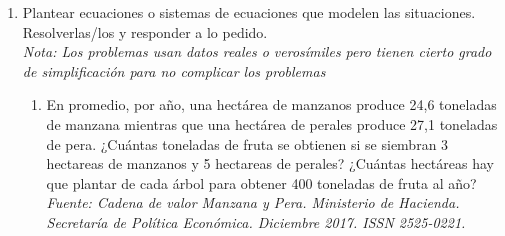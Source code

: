 \documentclass[a4paper]{article}
\makeatletter
\newcommand{\exercise}{\item}
\newenvironment{amatrix}[1]{%
  \left(\begin{array}{@{}*{#1}{c}|c@{}}
}{%
  \end{array}\right)
}
\makeatother
\begin{document}
\begin{enumerate}
\begin{multicols}{2}
\begin{enumerate} [label=(\alph*)]
		\item $\begin{amatrix}{2} 1 & 0 & 4 \\ 0 & 0 & 0 \end{amatrix}$
		\item $\begin{amatrix}{3} 1 & -2 & 0 & 7 \\ 0 & 3 & 1 & -5 \\ 0 & 0 & 0 & 0 \end{amatrix}$
		\item $\begin{amatrix}{3} 1 & 0 & -1 & 7 \\ 0 & 1 & 2 & 0 \\ 0 & 0 & 0 & 0 \\ 0 & 0 & 0 & 0 \end{amatrix}$
		\item $\begin{amatrix}{4} 1 & -2 & 0 & 0 & -6 \\ 0 & 0 & 1 & 0 & 2 \\ 0 & 0 & 0 & 1 & 0 \end{amatrix}$
		\item $\begin{amatrix}{4} 1 & -1 & 2 & 3 & -2 \\ 0 & 0 & 0 & 0 & 3 \\ 0 & 0 & 0 & 0 & 0 \end{amatrix}$
		\item $\begin{amatrix}{4} 1 & 0 & 0 & -1 & \frac{1}{2} \\ 0 & 0 & 1 & \frac{3}{4} & 2 \\ 0 & 0 & 0 & 0 & 0 \end{amatrix}$
	\end{enumerate}
	\end{multicols}
	\exercise Plantear ecuaciones o sistemas de ecuaciones que modelen las situaciones. Resolverlas/los y responder a lo pedido. \\ \textit{Nota: Los problemas usan datos reales o verosímiles pero tienen cierto grado de simplificación para no complicar los problemas}
	\begin{enumerate} [label=(\alph*)]
		\item En promedio, por año, una hectárea de manzanos produce 24,6 toneladas de manzana mientras que una hectárea de perales produce 27,1 toneladas de pera. ¿Cuántas toneladas de fruta se obtienen si se siembran 3 hectareas de manzanos y 5 hectareas de perales? ¿Cuántas hectáreas hay que plantar de cada árbol para obtener 400 toneladas de fruta al año? \\ \textit{Fuente: Cadena de valor Manzana y Pera. Ministerio de Hacienda. Secretaría de Política Económica. Diciembre 2017. ISSN 2525-0221.}

\end{enumerate}
\end{enumerate}
\end{document}
